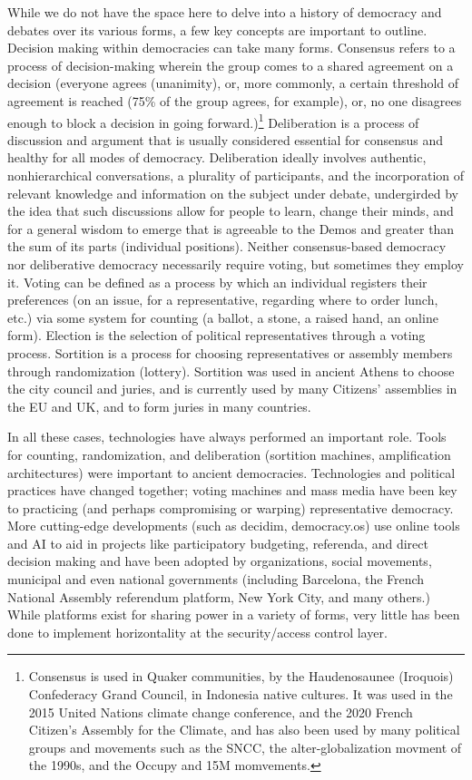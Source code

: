 While we do not have the space here to delve into a history of democracy and
debates over its various forms, a few key concepts are important to outline.
Decision making within democracies can take many forms. Consensus refers to a
process of decision-making wherein the group comes to a shared agreement on a
decision (everyone agrees (unanimity), or, more commonly, a certain threshold of
agreement is reached (75\% of the group agrees, for example), or, no one
disagrees enough to block a decision in going forward.)\footnote{Consensus is
used in Quaker communities, by the Haudenosaunee (Iroquois) Confederacy Grand
Council, in Indonesia native cultures. It was used in the 2015 United Nations
climate change conference, and the 2020 French Citizen’s Assembly for the
Climate, and has also been used by many political groups and movements such as
the SNCC, the alter-globalization movment of the 1990s, and the Occupy and 15M
momvements.} Deliberation is a process of discussion and argument that is
usually considered essential for consensus and healthy for all modes of
democracy. Deliberation ideally involves authentic, nonhierarchical
conversations, a plurality of participants, and the incorporation of relevant
knowledge and information on the subject under debate, undergirded by the idea
that such discussions allow for people to learn, change their minds, and for a
general wisdom to emerge that is agreeable to the Demos and greater than the sum
of its parts (individual positions). Neither consensus-based democracy nor
deliberative democracy necessarily require voting, but sometimes they employ it.
Voting can be defined as a process by which an individual registers their
preferences (on an issue, for a representative, regarding where to order lunch,
etc.) via some system for counting (a ballot, a stone, a raised hand, an online
form). Election is the selection of political representatives through a voting
process. Sortition is a process for choosing representatives or assembly members
through randomization (lottery). Sortition was used in ancient Athens to choose
the city council and juries, and is currently used by many Citizens’ assemblies
in the EU and UK, and to form juries in many countries. 

In all these cases, technologies have always performed an important role. Tools
for counting, randomization, and deliberation (sortition machines, amplification
architectures) were important to ancient democracies. Technologies and political
practices have changed together; voting machines and mass media have been key to
practicing (and perhaps compromising or warping) representative democracy. More
cutting-edge developments (such as decidim, democracy.os) use online tools and
AI to aid in projects like participatory budgeting, referenda, and direct
decision making and have been adopted by organizations, social movements,
municipal and even national governments (including Barcelona, the French
National Assembly referendum platform, New York City, and many others.) While
platforms exist for sharing power in a variety of forms, very little has been
done to implement horizontality at the security/access control layer.  

